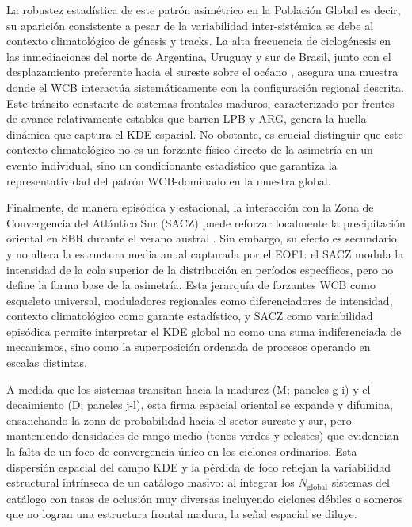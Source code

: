 La robustez estadística de este patrón asimétrico en la Población Global es decir, su aparición consistente a pesar de la variabilidad inter-sistémica se debe al contexto climatológico de génesis y tracks. La alta frecuencia de ciclogénesis en las inmediaciones del norte de Argentina, Uruguay y sur de Brasil, junto con el desplazamiento preferente hacia el sureste sobre el océano \citep{mendes2010climatology, simmonds2000mean}, asegura una muestra donde el WCB interactúa sistemáticamente con la configuración regional descrita. Este tránsito constante de sistemas frontales maduros, caracterizado por frentes de avance relativamente estables que barren LPB y ARG, genera la huella dinámica que captura el KDE espacial. No obstante, es crucial distinguir que este contexto climatológico no es un forzante físico directo de la asimetría en un evento individual, sino un condicionante estadístico que garantiza la representatividad del patrón WCB-dominado en la muestra global.

Finalmente, de manera episódica y estacional, la interacción con la Zona de Convergencia del Atlántico Sur (SACZ) puede reforzar localmente la precipitación oriental en SBR durante el verano austral \citep{hoskins2005new}. Sin embargo, su efecto es secundario y no altera la estructura media anual capturada por el EOF1: el SACZ modula la intensidad de la cola superior de la distribución en períodos específicos, pero no define la forma base de la asimetría. Esta jerarquía de forzantes WCB como esqueleto universal, moduladores regionales como diferenciadores de intensidad, contexto climatológico como garante estadístico, y SACZ como variabilidad episódica permite interpretar el KDE global no como una suma indiferenciada de mecanismos, sino como la superposición ordenada de procesos operando en escalas distintas.

A medida que los sistemas transitan hacia la madurez (M; paneles g-i) y el decaimiento (D; paneles j-l), esta firma espacial oriental se expande y difumina, ensanchando la zona de probabilidad hacia el sector sureste y sur, pero manteniendo densidades de rango medio (tonos verdes y celestes) que evidencian la falta de un foco de convergencia único en los ciclones ordinarios. Esta dispersión espacial del campo KDE y la pérdida de foco reflejan la variabilidad estructural intrínseca de un catálogo masivo: al integrar los $N_{\text{global}}$ sistemas del catálogo con tasas de oclusión muy diversas incluyendo ciclones débiles o someros que no logran una estructura frontal madura, la señal espacial se diluye. 

